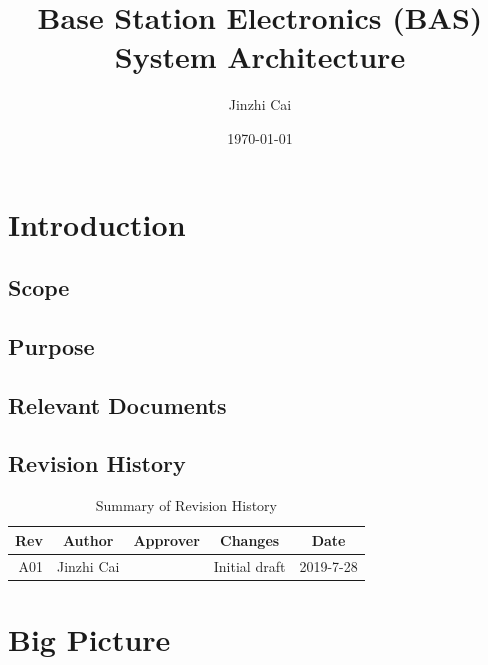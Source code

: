 \documentclass[12pt,article]{memoir}
\title{Base Station Electronics (BAS) System Architecture}
\author{Jinzhi Cai}
\date{\today}
\begin{document}
	


\tableofcontents*
\clearpage


\chapter{Introduction}
\section{Scope}

\section{Purpose}

\section{Relevant Documents}

\section{Revision History}
\begin{table}[H]
	\centering
	\begin{tabu}{r || c | c | c | c }
		Rev & Author     & Approver & Changes       & Date      \\ \hline
		A01 & Jinzhi Cai &          & Initial draft & 2019-7-28 \\
	\end{tabu}
	\caption{Summary of Revision History}
	\label{tab:rev}
\end{table}
\newpage
\chapter{Big Picture}
\newpage
\end{document}
